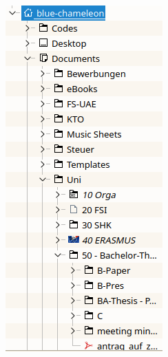 \begin{frame}[t,fragile]
\begin{columns}[T]
\includegraphics[width=\linewidth]{./gfx/foldertree}
%
\end{columns}
%
\end{frame}

